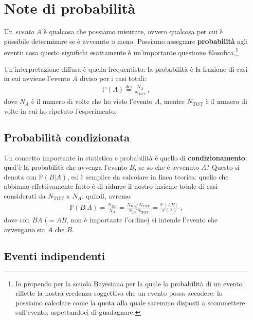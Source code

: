 \documentclass{article}
\begin{document}
\section{Note di probabilità}

Un \emph{evento} \(A\) è qualcosa che possiamo misurare, ovvero qualcosa per cui è possibile determinare se è avvenuto o meno. 
Possiamo assegnare \textbf{probabilità} agli eventi: cosa questo significhi esattamente è un'importante questione filosofica.\footnote{Io propendo per la scuola Bayesiana per la quale la probabilità di un evento riflette la nostra credenza soggettiva che un evento possa accadere: la possiamo calcolare come la quota alla quale saremmo disposti a scommettere sull'evento, aspettandoci di guadagnare.}

Un'interpretazione diffusa è quella frequentista: la probabilità è la frazione di casi in cui avviene l'evento \(A\) diviso per i casi totali: 
%
\begin{align}
    \mathbb{P} (A) \overset{\text{def}}{=} \frac{N_A}{N _{\text{TOT}}}
    \,,
\end{align}
%
dove \(N_A\) è il numero di volte che ho visto l'evento \(A\), mentre \(N _{\text{TOT}}\) è il numero di volte in cui ho ripetuto l'esperimento.

\subsection{Probabilità condizionata}

Un concetto importante in statistica e probabilità è quello di \textbf{condizionamento}: qual'è la probabilità che avvenga l'evento \(B\), se so che è avvenuto \(A\)? 
Questo si denota con \(\mathbb{P} (B | A)\), ed è semplice da calcolare in linea teorica: quello che abbiamo effettivamente fatto è di ridurre il nostro insieme totale di casi considerati da \(N _{\text{TOT}}\) a \(N_A\): quindi, avremo 
%
\begin{align} \label{eq:probabilita-condizionata}
\mathbb{P}(B | A) = \frac{N_{BA}}{N_A} = \frac{ N_{BA} / N _{\text{TOT}}}{N_A / N _{\text{TOT}}} = \frac{\mathbb{P}(AB)}{\mathbb{P}(A)}
\,,
\end{align}
%
dove con \(BA\) (\(= AB\), non è importante l'ordine) si intende l'evento che avvengano sia \(A\) che \(B\). 

\subsection{Eventi indipendenti}
\end{document}

